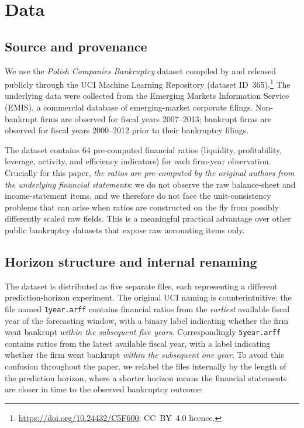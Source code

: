\documentclass[11pt,a4paper]{article}
\begin{document}
\section{Data}\label{sec:data}

\subsection{Source and provenance}

We use the \textit{Polish Companies Bankruptcy} dataset compiled by
\cite{zieba2016} and released publicly through the UCI Machine Learning
Repository (dataset ID~365).\footnote{\url{https://doi.org/10.24432/C5F600};
CC~BY~4.0 licence.} The underlying data were collected from the Emerging
Markets Information Service (EMIS), a commercial database of emerging-market
corporate filings. Non-bankrupt firms are observed for fiscal years
2007--2013; bankrupt firms are observed for fiscal years 2000--2012 prior to
their bankruptcy filings.

The dataset contains 64 pre-computed financial ratios (liquidity,
profitability, leverage, activity, and efficiency indicators) for each
firm-year observation. Crucially for this paper, \textit{the ratios are
pre-computed by the original authors from the underlying financial
statements}: we do not observe the raw balance-sheet and income-statement
items, and we therefore do not face the unit-consistency problems that can
arise when ratios are constructed on the fly from possibly differently scaled
raw fields. This is a meaningful practical advantage over other public
bankruptcy datasets that expose raw accounting items only.

\subsection{Horizon structure and internal renaming}
\label{sec:horizons}

The dataset is distributed as five separate files, each representing a
different prediction-horizon experiment. The original UCI naming is
counterintuitive: the file named \texttt{1year.arff} contains financial
ratios from the \textit{earliest} available fiscal year of the forecasting
window, with a binary label indicating whether the firm went bankrupt
\textit{within the subsequent five years}. Correspondingly
\texttt{5year.arff} contains ratios from the latest available fiscal year,
with a label indicating whether the firm went bankrupt \textit{within the
subsequent one year}. To avoid this confusion throughout the paper, we
relabel the files internally by the length of the prediction horizon, where
a shorter horizon means the financial statements are closer in time to the
observed bankruptcy outcome:
\end{document}

